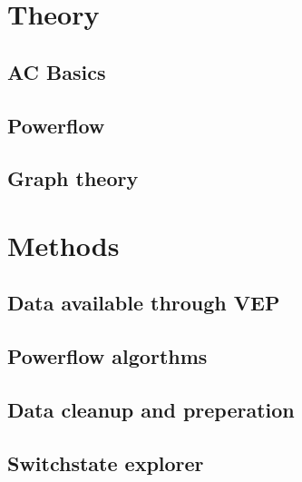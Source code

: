 \documentclass[a4paper]{report}
\begin{document}



\chapter{Theory}


\section{AC Basics}



\section{Powerflow}



\section{Graph theory}



\chapter{Methods}

\section{Data available through VEP}



\section{Powerflow algorthms}



\section{Data cleanup and preperation}



\section{Switchstate explorer}
\end{document}
